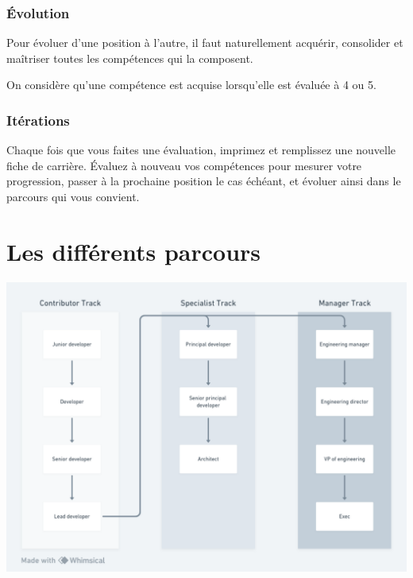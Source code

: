 \documentclass[a4paper, french, openany, 12pt]{book}
\begin{document}
\begin{multicols}{2}
  \section*{Évolution}
  
  Pour évoluer d'une position à l'autre, il faut naturellement acquérir, consolider et maîtriser toutes les compétences
  qui la composent.

  On considère qu'une compétence est acquise lorsqu'elle est évaluée à 4 ou 5.

  \section*{Itérations}

  Chaque fois que vous faites une évaluation, imprimez et remplissez une nouvelle fiche de carrière.
  Évaluez à nouveau vos compétences pour mesurer votre progression, passer à la prochaine position le cas échéant,
  et évoluer ainsi dans le parcours qui vous convient.

\end{multicols}

\part{Les différents parcours}

\includegraphics[width=\textwidth]{images/tracks.png}
\end{document}
